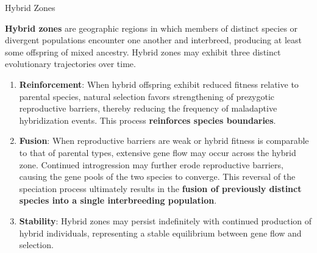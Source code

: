 \documentclass[10pt]{article}
\begin{document}
    \begin{core}{Hybrid Zones}

      \textbf{Hybrid zones} are geographic regions in which members of distinct species or divergent populations encounter one another and interbreed, producing at least some offspring of mixed ancestry. Hybrid zones may exhibit three distinct evolutionary trajectories over time.


      \begin{enumerate}

        \item \textbf{Reinforcement}: When hybrid offspring exhibit reduced fitness relative to parental species, natural selection favors strengthening of prezygotic reproductive barriers, thereby reducing the frequency of maladaptive hybridization events. This process \textbf{reinforces species boundaries}.

        \item \textbf{Fusion}: When reproductive barriers are weak or hybrid fitness is comparable to that of parental types, extensive gene flow may occur across the hybrid zone. Continued introgression may further erode reproductive barriers, causing the gene pools of the two species to converge. This reversal of the speciation process ultimately results in the \textbf{fusion of previously distinct species into a single interbreeding population}.

        \item \textbf{Stability}: Hybrid zones may persist indefinitely with continued production of hybrid individuals, representing a stable equilibrium between gene flow and selection.

      \end{enumerate}

    \end{core}
\end{document}
